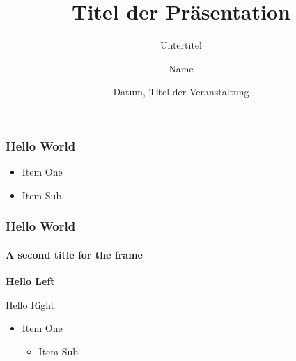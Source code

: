 \documentclass[aspectratio=169,10pt]{beamer}
\title{Titel der Pr\"asentation}
\subtitle{Untertitel}
\author{Name}
\institute{Institut XY\\Universität Bern}
\date{Datum, Titel der Veranstaltung}
\begin{document}
\begin{frame}
\maketitle
\end{frame}

\begin{frame}
	\frametitle{Hello World}
	
	\begin{itemize}
	\item Item One
	\item Item Sub
	\end{itemize}
\end{frame}

\begin{frame}
	\frametitle{Hello World}
\framesubtitle{A second title for the frame}
\begin{flushleft}
\textbf{Hello Left}
\end{flushleft}
\begin{flushright}
Hello Right
\end{flushright}

\begin{itemize}
\item Item One
\begin{itemize}
\item Item Sub
\end{itemize}
\end{itemize}
\end{frame}
\end{document}
